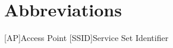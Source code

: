\appendix
\renewcommand{\appendixtocname}{Appendix}
\renewcommand{\appendixpagename}{\appendixtocname}
\addappheadtotoc
{}
\appendixpage

\chapter{Abbreviations}

\begin{acronym}[\hspace{3cm}]
  [AP]{Access Point}
  [SSID]{Service Set Identifier}
\end{acronym}

\clearpage
\listoffigures
{}
